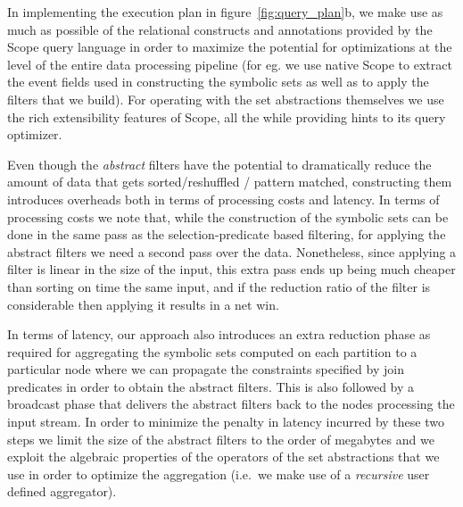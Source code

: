 In implementing the execution plan in figure~\ref{fig:query_plan}b,
we make use as much as possible of the relational constructs and annotations 
provided by the Scope query language in order to maximize the potential for 
optimizations at the level of the entire data processing pipeline (for eg. we 
use native Scope to extract the event fields used in constructing the symbolic 
sets as well as to apply the filters that we build).
For operating with the set abstractions themselves we use the rich 
extensibility features of Scope, all the while providing hints to its query 
optimizer.

Even though the {\em abstract} filters have the potential to dramatically 
reduce the amount of data that gets sorted/reshuffled / pattern matched, 
constructing them introduces overheads both in terms of processing costs and 
latency.
In terms of processing costs we note that, while the construction of the 
symbolic sets can be done in the same pass as the selection-predicate based 
filtering, for applying the abstract filters we need a second pass over the 
data.
Nonetheless, since applying a filter is linear in the size of the input, this 
extra pass ends up being much cheaper than sorting on time the same input, and 
if the reduction ratio of the filter is considerable then applying it results 
in a net win. 
   
In terms of latency, our approach also introduces an extra reduction phase as 
required for aggregating the symbolic sets computed on each partition to a 
particular node where we can propagate the constraints specified by join 
predicates in order to obtain the abstract filters.
This is also followed by a broadcast phase that delivers the abstract filters 
back to the nodes processing the input stream.
In order to minimize the penalty in latency incurred by these two steps we 
limit the size of the abstract filters to the order of megabytes and we exploit 
the algebraic properties of the operators of the set abstractions that we use 
in order to optimize the aggregation (i.e.\ we make use of a {\em recursive} 
user defined aggregator).





  
  
  
  